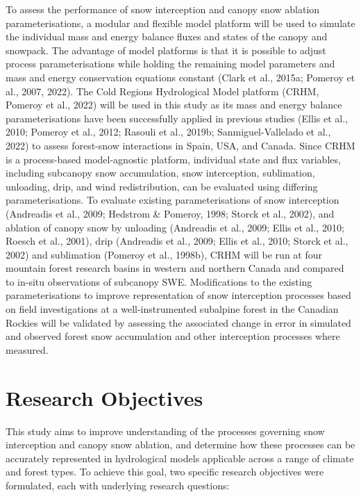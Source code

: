 \documentclass[
  letterpaper,
]{tex/uofsthesis-cs}
\begin{document}
To assess the performance of snow interception and canopy snow ablation
parameterisations, a modular and flexible model platform will be used to
simulate the individual mass and energy balance fluxes and states of the
canopy and snowpack. The advantage of model platforms is that it is
possible to adjust process parameterisations while holding the remaining
model parameters and mass and energy conservation equations constant
(Clark et al., 2015a; Pomeroy et al., 2007, 2022). The Cold Regions
Hydrological Model platform (CRHM, Pomeroy et al., 2022) will be used in
this study as its mass and energy balance parameterisations have been
successfully applied in previous studies (Ellis et al., 2010; Pomeroy et
al., 2012; Rasouli et al., 2019b; Sanmiguel-Vallelado et al., 2022) to
assess forest-snow interactions in Spain, USA, and Canada. Since CRHM is
a process-based model-agnostic platform, individual state and flux
variables, including subcanopy snow accumulation, snow interception,
sublimation, unloading, drip, and wind redistribution, can be evaluated
using differing parameterisations. To evaluate existing
parameterisations of snow interception (Andreadis et al., 2009; Hedstrom
\& Pomeroy, 1998; Storck et al., 2002), and ablation of canopy snow by
unloading (Andreadis et al., 2009; Ellis et al., 2010; Roesch et al.,
2001), drip (Andreadis et al., 2009; Ellis et al., 2010; Storck et al.,
2002) and sublimation (Pomeroy et al., 1998b), CRHM will be run at four
mountain forest research basins in western and northern Canada and
compared to in-situ observations of subcanopy SWE. Modifications to the
existing parameterisations to improve representation of snow
interception processes based on field investigations at a
well-instrumented subalpine forest in the Canadian Rockies will be
validated by assessing the associated change in error in simulated and
observed forest snow accumulation and other interception processes where
measured.

\section{Research Objectives}\label{research-objectives}

This study aims to improve understanding of the processes governing snow
interception and canopy snow ablation, and determine how these processes
can be accurately represented in hydrological models applicable across a
range of climate and forest types. To achieve this goal, two specific
research objectives were formulated, each with underlying research
questions:
\end{document}
